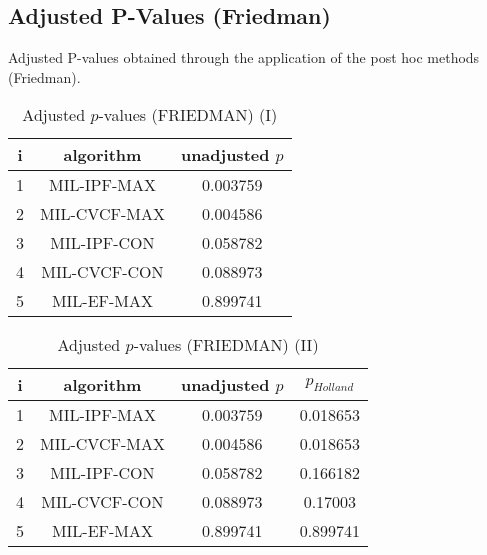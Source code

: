 \documentclass[a4paper,10pt]{article}
\begin{document}
\begin{landscape}
\newpage

\section{Adjusted P-Values (Friedman)}


Adjusted P-values obtained through the application of the post hoc methods (Friedman).

\begin{table}[!htp]
\centering\small
\begin{tabular}{ccc}
i&algorithm&unadjusted $p$\\
\hline1&MIL-IPF-MAX&0.003759\\2&MIL-CVCF-MAX&0.004586\\3&MIL-IPF-CON&0.058782\\4&MIL-CVCF-CON&0.088973\\5&MIL-EF-MAX&0.899741\\\hline
\end{tabular}
\caption{Adjusted $p$-values (FRIEDMAN) (I)}
\end{table}
\begin{table}[!htp]
\centering\small
\begin{tabular}{cccc}
i&algorithm&unadjusted $p$&$p_{Holland}$\\
\hline1&MIL-IPF-MAX&0.003759&0.018653\\2&MIL-CVCF-MAX&0.004586&0.018653\\3&MIL-IPF-CON&0.058782&0.166182\\4&MIL-CVCF-CON&0.088973&0.17003\\5&MIL-EF-MAX&0.899741&0.899741\\\hline
\end{tabular}
\caption{Adjusted $p$-values (FRIEDMAN) (II)}
\end{table}

\newpage
\end{landscape}
\end{document}

